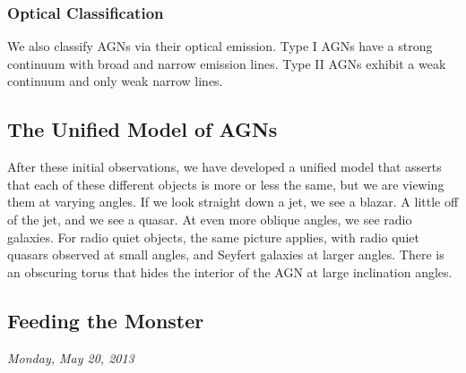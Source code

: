 \documentclass[10pt]{article}
\numberwithin{equation}{section}
\begin{document}
	\subsubsection{Optical Classification} %
	\label{ssub:optical_classification}
	We also classify AGNs via their optical emission. Type I AGNs have a strong continuum  with broad and narrow emission lines. Type II AGNs exhibit a weak continuum and only weak narrow lines.
	\subsection{The Unified Model of AGNs} %
	\label{sub:the_unified_model_of_agns}
	After these initial observations, we have developed a unified model that asserts that each of these different objects is more or less the same, but we are viewing them at varying angles. If we look straight down a jet, we see a blazar. A little off of the jet, and we see a quasar. At even more oblique angles, we see radio galaxies. For radio quiet objects, the same picture applies, with radio quiet quasars observed at small angles, and Seyfert galaxies at larger angles. There is an obscuring torus that hides the interior of the AGN at large inclination angles.
	
	\subsection{Feeding the Monster} %
	\label{sub:feeding_the_monster}
	\emph{Monday, May 20, 2013}\\
	
\end{document}
